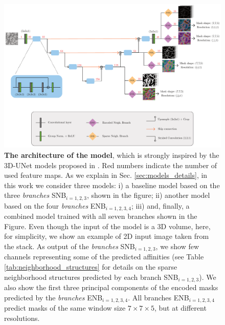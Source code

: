 \begin{figure}[tbp]
\centering
        \includegraphics[width=\textwidth]{./figures/LSIMasks/UNet_architecture.pdf} %
        \vspace{1em}
        \caption{\textbf{The architecture of the model}, which is strongly inspired by the 3D-UNet models proposed in \cite{lee2017superhuman,funke2018large}. 
        Red numbers indicate the number of used feature maps.
        As we explain in Sec. \ref{sec:models_details}, in this work we consider three models: i) a baseline model based on the three \emph{\sparseBr branches} SNB$_{i=1,2,3}$, shown in the figure; ii) another model based on the four \emph{\encBr branches} ENB$_{i=1,2,3,4}$; iii) and, finally, a combined model trained with all seven branches shown in the Figure.
        Even though the input of the model is a 3D volume, here, for simplicity, we show an example of 2D input image taken from the stack. As output of the \emph{\sparseBr branches} SNB$_{i=1,2,3}$, we show few channels representing some of the predicted affinities (see Table \ref{tab:neighborhood_structures} for details on the sparse neighborhood structures predicted by each branch SNB$_{i=1,2,3}$). We also show the first three principal components of the encoded masks predicted by the \emph{\encBr branches} ENB$_{i=1,2,3,4}$. All branches ENB$_{i=1,2,3,4}$ predict \maskname masks of the same window size $7 \times 7 \times 5$, but at different resolutions.}
    \label{fig:model_architecture}
\end{figure}

